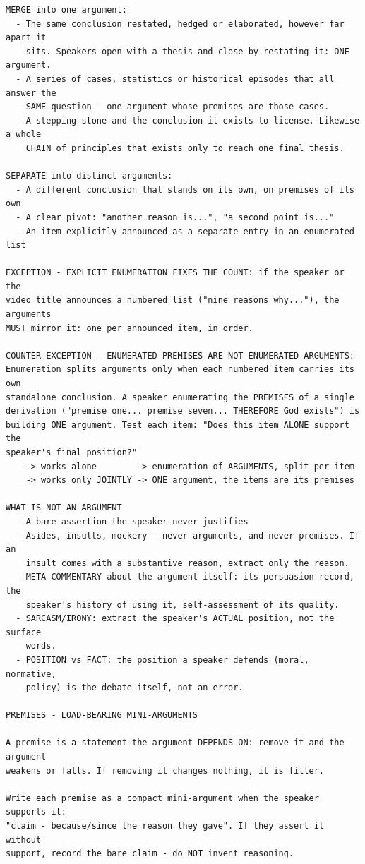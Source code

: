 \documentclass[a4paper, 12pt]{book}
\begin{document}
\begin{lstlisting}[basicstyle=\ttfamily\scriptsize,breaklines=true]
MERGE into one argument:
  - The same conclusion restated, hedged or elaborated, however far apart it
    sits. Speakers open with a thesis and close by restating it: ONE argument.
  - A series of cases, statistics or historical episodes that all answer the
    SAME question - one argument whose premises are those cases.
  - A stepping stone and the conclusion it exists to license. Likewise a whole
    CHAIN of principles that exists only to reach one final thesis.

SEPARATE into distinct arguments:
  - A different conclusion that stands on its own, on premises of its own
  - A clear pivot: "another reason is...", "a second point is..."
  - An item explicitly announced as a separate entry in an enumerated list

EXCEPTION - EXPLICIT ENUMERATION FIXES THE COUNT: if the speaker or the
video title announces a numbered list ("nine reasons why..."), the arguments
MUST mirror it: one per announced item, in order.

COUNTER-EXCEPTION - ENUMERATED PREMISES ARE NOT ENUMERATED ARGUMENTS:
Enumeration splits arguments only when each numbered item carries its own
standalone conclusion. A speaker enumerating the PREMISES of a single
derivation ("premise one... premise seven... THEREFORE God exists") is
building ONE argument. Test each item: "Does this item ALONE support the
speaker's final position?"
    -> works alone        -> enumeration of ARGUMENTS, split per item
    -> works only JOINTLY -> ONE argument, the items are its premises

WHAT IS NOT AN ARGUMENT
  - A bare assertion the speaker never justifies
  - Asides, insults, mockery - never arguments, and never premises. If an
    insult comes with a substantive reason, extract only the reason.
  - META-COMMENTARY about the argument itself: its persuasion record, the
    speaker's history of using it, self-assessment of its quality.
  - SARCASM/IRONY: extract the speaker's ACTUAL position, not the surface
    words.
  - POSITION vs FACT: the position a speaker defends (moral, normative,
    policy) is the debate itself, not an error.

PREMISES - LOAD-BEARING MINI-ARGUMENTS

A premise is a statement the argument DEPENDS ON: remove it and the argument
weakens or falls. If removing it changes nothing, it is filler.

Write each premise as a compact mini-argument when the speaker supports it:
"claim - because/since the reason they gave". If they assert it without
support, record the bare claim - do NOT invent reasoning.


\end{lstlisting}
\end{document}
